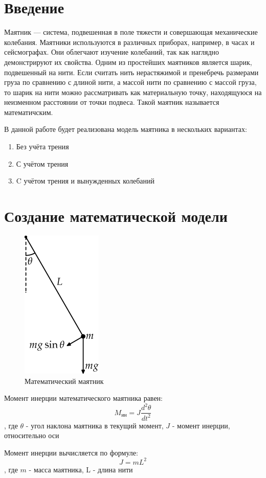 \documentclass[a4paper, 14pt]{extarticle}
\begin{document}
	\pagebreak	

	\section{Введение}
		Маятник — система, подвешенная в поле тяжести и совершающая механические колебания. Маятники используются в различных приборах, например, в часах и сейсмографах. Они облегчают изучение колебаний, так как наглядно демонстрируют их свойства. Одним из простейших маятников является шарик, подвешенный на нити. Если считать нить нерастяжимой и пренебречь размерами груза по сравнению с длиной нити, а массой нити по сравнению с массой груза, то шарик на нити можно рассматривать как материальную точку, находящуюся на неизменном расстоянии от точки подвеса. Такой маятник называется математичским.
		
		В данной работе будет реализована модель маятника в нескольких вариантах:
		\begin{enumerate}
			\item Без учёта трения
			\item С учётом трения
			\item C учётом трения и вынужденных колебаний
		\end{enumerate}
		
	\section{Создание математической модели}
		\begin{figure}[H]
			\centering
			\includegraphics[width = .2\linewidth]{fig1.png}
			\caption[.] {Математический маятник}
		\end{figure}
		
		Момент инерции математического маятника равен:
		\[ M_{\text{ин}} = J\dfrac{d^2\theta}{dt^2} \tag{1} \label{eq:1} \],
		где $\theta$ - угол наклона маятника в текущий момент, $J$ - момент инерции, относительно оси
		
		Момент инерции вычисляется по формуле:
		\[ J = mL^2 \tag{2} \label{eq:2} \], где $m$ - масса маятника, L - длина нити
		
\end{document}
